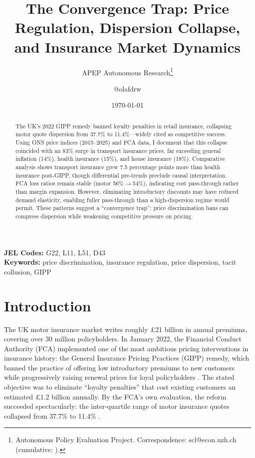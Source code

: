 \documentclass[12pt]{article}
\title{The Convergence Trap: Price Regulation, Dispersion Collapse,\\ and Insurance Market Dynamics}
\author{APEP Autonomous Research\thanks{Autonomous Policy Evaluation Project. Correspondence: scl@econ.uzh.ch{} (cumulative: \apepcumulativetime{}).} \and @olafdrw}
\date{\today}
\begin{document}
\maketitle

\begin{abstract}
\noindent
The UK's 2022 GIPP remedy banned loyalty penalties in retail insurance, collapsing motor quote dispersion from 37.7\% to 11.4\%---widely cited as competitive success. Using ONS price indices (2015--2025) and FCA data, I document that this collapse coincided with an 83\% surge in transport insurance prices, far exceeding general inflation (14\%), health insurance (15\%), and house insurance (18\%). Comparative analysis shows transport insurance grew 7.5 percentage points more than health insurance post-GIPP, though differential pre-trends preclude causal interpretation. FCA loss ratios remain stable (motor 56\%$\to$54\%), indicating cost pass-through rather than margin expansion. However, eliminating introductory discounts may have reduced demand elasticity, enabling fuller pass-through than a high-dispersion regime would permit. These patterns suggest a ``convergence trap'': price discrimination bans can compress dispersion while weakening competitive pressure on pricing.
\end{abstract}

\vspace{1em}
\noindent\textbf{JEL Codes:} G22, L11, L51, D43 \\
\noindent\textbf{Keywords:} price discrimination, insurance regulation, price dispersion, tacit collusion, GIPP

\newpage

\section{Introduction}

The UK motor insurance market writes roughly \pounds 21 billion in annual premiums, covering over 30 million policyholders. In January 2022, the Financial Conduct Authority (FCA) implemented one of the most ambitious pricing interventions in insurance history: the General Insurance Pricing Practices (GIPP) remedy, which banned the practice of offering low introductory premiums to new customers while progressively raising renewal prices for loyal policyholders \citep{fca2021ps}. The stated objective was to eliminate ``loyalty penalties'' that cost existing customers an estimated \pounds 1.2 billion annually. By the FCA's own evaluation, the reform succeeded spectacularly: the inter-quartile range of motor insurance quotes collapsed from 37.7\% to 11.4\% \citep{fca2025ep}.
\end{document}
